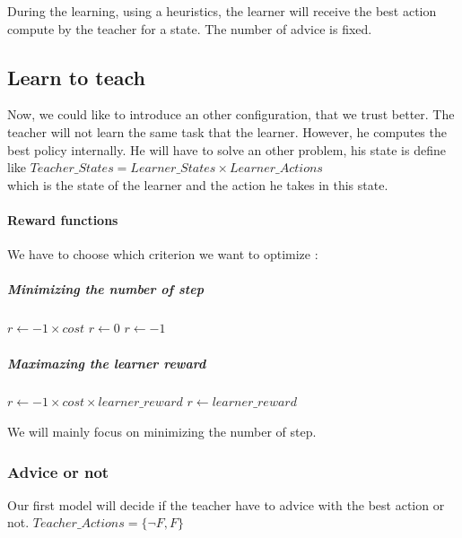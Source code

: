 \documentclass[a4paper,12pt]{article}
\begin{document}
      During the learning, using a heuristics, the learner will receive the best action compute by the teacher
      for a state. The number of advice is fixed.
      
      \subsection{Learn to teach}
      
      Now, we could like to introduce an other configuration, that we trust better.
      The teacher will not learn the same task that the learner. However, he computes the best policy internally. 
      He will have to solve an other problem, his state is define like 
      $Teacher\_States = Learner\_States \times Learner\_Actions$\\
      which is the state of the learner and the action he takes in this state.
      
      \paragraph{Reward functions}
      
      We have to choose which criterion we want to optimize :
      
      \subparagraph{Minimizing the number of step}

	  \begin{algorithmic}
	      \State $r\gets -1 \times cost$
	  \Else
		  \State $r\gets 0$
	      \Else
		  \State $r\gets -1$
	      \EndIf
	  \EndIf
	  \end{algorithmic}

      
      \subparagraph{Maximazing the learner reward}
      
	  \begin{algorithmic}
	  \If {$giveAdvice$}
	      \State $r\gets -1  \times cost \times learner\_reward $
	  \Else
	      \State $r\gets learner\_reward$
	  \EndIf
	  \end{algorithmic}
	  
	  
	  We will mainly focus on minimizing the number of step.
      
      \subsubsection{Advice or not}
      
      Our first model will decide if the teacher have to advice with the best action or not.
      $Teacher\_Actions = \{\neg F, F\}$
      
\end{document}
